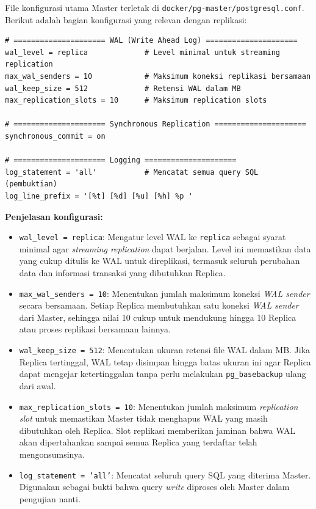 File konfigurasi utama Master terletak di
\texttt{docker/pg-master/postgresql.conf}. Berikut adalah bagian
konfigurasi yang relevan dengan replikasi:

\begin{lstlisting}[caption={Konfigurasi Replikasi pada PostgreSQL Master
(docker/pg-master/postgresql.conf)}, label={lst:master-conf}]
# ===================== WAL (Write Ahead Log) =====================
wal_level = replica             # Level minimal untuk streaming replication
max_wal_senders = 10            # Maksimum koneksi replikasi bersamaan
wal_keep_size = 512             # Retensi WAL dalam MB
max_replication_slots = 10      # Maksimum replication slots

# ===================== Synchronous Replication =====================
synchronous_commit = on

# ===================== Logging =====================
log_statement = 'all'           # Mencatat semua query SQL (pembuktian)
log_line_prefix = '[%t] [%d] [%u] [%h] %p '
\end{lstlisting}

\textbf{Penjelasan konfigurasi:}
\begin{itemize}
    \item \texttt{wal\_level = replica}: Mengatur level WAL ke
    \texttt{replica} sebagai syarat minimal agar \textit{streaming
    replication} dapat berjalan. Level ini memastikan data yang cukup
    ditulis ke WAL untuk direplikasi, termasuk seluruh perubahan data
    dan informasi transaksi yang dibutuhkan Replica.
    \item \texttt{max\_wal\_senders = 10}: Menentukan jumlah maksimum
    koneksi \textit{WAL sender} secara bersamaan. Setiap Replica
    membutuhkan satu koneksi \textit{WAL sender} dari Master, sehingga
    nilai 10 cukup untuk mendukung hingga 10 Replica atau proses
    replikasi bersamaan lainnya.
    \item \texttt{wal\_keep\_size = 512}: Menentukan ukuran retensi
    file WAL dalam MB. Jika Replica tertinggal, WAL tetap disimpan
    hingga batas ukuran ini agar Replica dapat mengejar
    ketertinggalan tanpa perlu melakukan \texttt{pg\_basebackup}
    ulang dari awal.
    \item \texttt{max\_replication\_slots = 10}: Menentukan jumlah
    maksimum \textit{replication slot} untuk memastikan Master tidak
    menghapus WAL yang masih dibutuhkan oleh Replica. Slot replikasi
    memberikan jaminan bahwa WAL akan dipertahankan sampai semua
    Replica yang terdaftar telah mengonsumsinya.
    \item \texttt{log\_statement = 'all'}: Mencatat seluruh query SQL
    yang diterima Master. Digunakan sebagai bukti bahwa query
    \textit{write} diproses oleh Master dalam pengujian nanti.
\end{itemize}


